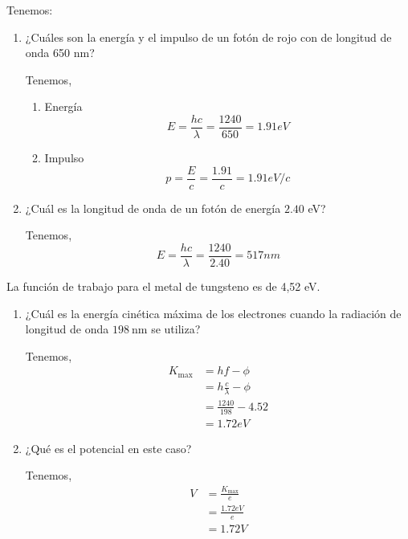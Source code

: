\begin{problema}
    [Problema 2]  Tenemos:
    \begin{enumerate}
        \item ¿Cuáles son la energía y el impulso de un fotón de rojo con de longitud de onda 650 nm? 
        \begin{sol}
            Tenemos, 
            \begin{enumerate}
                \item Energía 
                    $$E=\frac{hc}{\lambda}= \frac{1240}{650} =1.91 eV$$
                \item Impulso
                $$p=\frac{E}{c}= \frac{1.91}{c}= 1.91 eV/c$$
            \end{enumerate}
        \end{sol}
        \item ¿Cuál es la longitud de onda de un fotón de energía $2.40$ eV?
        \begin{sol}
            Tenemos, 
            $$E=\frac{hc}{\lambda}= \frac{1240}{2.40} =517 nm$$
        \end{sol}
    \end{enumerate} 
   
\end{problema}
\begin{problema}[Problema 3] 
    La función de trabajo para el metal de tungsteno es de 4,52 eV. 
    \begin{enumerate}
        \item ¿Cuál es la energía cinética máxima de los electrones cuando la radiación de longitud de onda $198 \mathrm{~nm}$ se utiliza?
        \begin{sol}
            Tenemos,
            \begin{align*}
                K_{\max}&=hf-\phi\\
                        &=h\frac{c}{\lambda}-\phi\\
                        &=\frac{1240}{198}-4.52\\
                        &= 1.72 eV
            \end{align*}
        \end{sol}
        \item ¿Qué es el potencial en este caso?
        \begin{sol}
            Tenemos, 
            \begin{align*}
                V &= \frac{K_{\max}}{e}\\
                &= \frac{1.72 eV}{e}\\
                &= 1.72 V
            \end{align*}
        \end{sol}
    \end{enumerate}
    
\end{problema}
